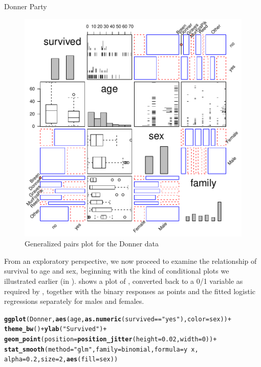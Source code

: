 \documentclass[11pt]{book}\usepackage[]{graphicx}\usepackage[]{color}
\makeatletter
\newcommand{\hlnum}[1]{\textcolor[rgb]{0.686,0.059,0.569}{#1}}%
\newcommand{\hlstr}[1]{\textcolor[rgb]{0.192,0.494,0.8}{#1}}%
\newcommand{\hlopt}[1]{\textcolor[rgb]{0,0,0}{#1}}%
\newcommand{\hlstd}[1]{\textcolor[rgb]{0.345,0.345,0.345}{#1}}%
\newcommand{\hlkwc}[1]{\textcolor[rgb]{0.333,0.667,0.333}{#1}}%
\newcommand{\hlkwd}[1]{\textcolor[rgb]{0.737,0.353,0.396}{\textbf{#1}}}%
\newenvironment{kframe}{%
 \def\at@end@of@kframe{}%
 \ifinner\ifhmode%
  \def\at@end@of@kframe{\end{minipage}}%
  \begin{minipage}{\columnwidth}%
 \fi\fi%
 \def\FrameCommand##1{\hskip\@totalleftmargin \hskip-\fboxsep
 \colorbox{shadecolor}{##1}\hskip-\fboxsep
     \hskip-\linewidth \hskip-\@totalleftmargin \hskip\columnwidth}%
 \MakeFramed {\advance\hsize-\width
   \@totalleftmargin\z@ \linewidth\hsize
   \@setminipage}}%
 {\par\unskip\endMakeFramed%
 \at@end@of@kframe}
\newenvironment{knitrout}{}{} %
\renewenvironment{knitrout}{\small\renewcommand{\baselinestretch}{.85}}{} %
\makeatother
\begin{document}
\begin{Example}[donner1]{Donner Party}
\begin{knitrout}
\begin{figure}[!htbp]
\centerline{\includegraphics[width=.7\textwidth]{ch07/fig/donner1-gpairs-1} }

\caption[Generalized pairs plot for the Donner data]{Generalized pairs plot for the Donner data\label{fig:donner1-gpairs}}
\end{figure}


\end{knitrout}


From an exploratory perspective,
we now proceed to examine the relationship of survival to age and sex, beginning with the
kind of conditional plots we illustrated earlier (in ).
 shows a plot of , converted back to
a 0/1 variable as required by , together with the binary responses
as points and the fitted logistic regressions separately for males and females.

\begin{knitrout}
\color{fgcolor}\begin{kframe}
\begin{alltt}
\hlkwd{ggplot}\hlstd{(Donner,} \hlkwd{aes}\hlstd{(age,} \hlkwd{as.numeric}\hlstd{(survived}\hlopt{==}\hlstr{"yes"}\hlstd{),} \hlkwc{color} \hlstd{= sex))} \hlopt{+}
  \hlkwd{theme_bw}\hlstd{()} \hlopt{+} \hlkwd{ylab}\hlstd{(}\hlstr{"Survived"}\hlstd{)} \hlopt{+}
  \hlkwd{geom_point}\hlstd{(}\hlkwc{position} \hlstd{=} \hlkwd{position_jitter}\hlstd{(}\hlkwc{height} \hlstd{=} \hlnum{0.02}\hlstd{,} \hlkwc{width} \hlstd{=} \hlnum{0}\hlstd{))} \hlopt{+}
  \hlkwd{stat_smooth}\hlstd{(}\hlkwc{method} \hlstd{=} \hlstr{"glm"}\hlstd{,} \hlkwc{family} \hlstd{= binomial,} \hlkwc{formula} \hlstd{= y} \hlopt{~} \hlstd{x,}
              \hlkwc{alpha} \hlstd{=} \hlnum{0.2}\hlstd{,} \hlkwc{size}\hlstd{=}\hlnum{2}\hlstd{,} \hlkwd{aes}\hlstd{(}\hlkwc{fill} \hlstd{= sex))}
\end{alltt}
\end{kframe}\begin{figure}[!htbp]



\end{figure}
\end{knitrout}
\end{Example}
\end{document}
